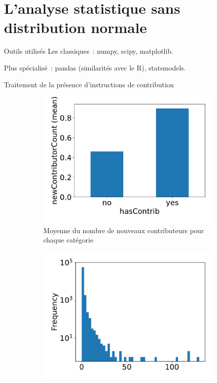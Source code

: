 \documentclass[usenames,dvipsnames,10pt]{beamer}
\begin{document}
\section{L'analyse statistique sans distribution normale}

\begin{frame}{Outils utilisés}
    Les classiques : numpy, scipy, matplotlib.

    Plus spécialisé : pandas (similarités avec le R), statsmodels.

\end{frame}

\begin{frame}{Traitement de la présence d'instructions de contribution}
    \begin{figure}
        \begin{subfigure}[t]{0.45\textwidth}
            \includegraphics[width=\textwidth]{../experiment/data_analysis/hasContrib_meanNewContributorCount}
            \caption{Moyenne du nombre de nouveaux contributeurs pour chaque catégorie}
        \end{subfigure}
        \begin{subfigure}[t]{0.45\textwidth}
            \includegraphics[width=\textwidth]{../experiment/data_analysis/newContributorCount_distribution}

\end{subfigure}
\end{figure}
\end{frame}
\end{document}
